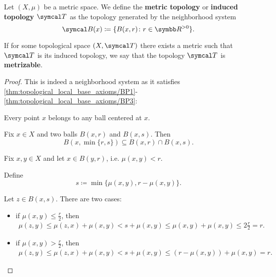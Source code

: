 \begin{definition}\label{def:metric_topology}\cite[249]{Engelking1989}
  Let \( (X, \mu) \) be a metric space. We define the \textbf{metric topology} or \textbf{induced topology} \( \Cal{T} \) as the topology generated by the neighborhood system
  \begin{equation*}
    \Cal{B}(x) \coloneqq \{ B (x, r) \colon r \in \BB{R}^{>0} \}.
  \end{equation*}

  If for some topological space \( (X, \Cal{T}) \) there exists a metric such that \( \Cal{T} \) is its induced topology, we say that the topology \( \Cal{T} \) is \textbf{metrizable}.
\end{definition}
\begin{proof}
  This is indeed a neighborhood system as it satisfies \ref{thm:topological_local_base_axioms/BP1}-\ref{thm:topological_local_base_axioms/BP3}:

  \begin{description}
     Every point \( x \) belongs to any ball centered at \( x \).

     Fix \( x \in X \) and two balls \( B(x, r) \) and \( B(x, s) \). Then
    \begin{equation*}
      B(x, \min\{ r, s \}) \subseteq B(x, r) \cap B(x, s).
    \end{equation*}

     Fix \( x, y \in X \) and let \( x \in B(y, r) \), i.e. \( \mu(x, y) < r \).

    Define
    \begin{equation*}
      s \coloneqq \min\{ \mu(x, y), r - \mu(x, y) \}.
    \end{equation*}

    Let \( z \in B(x, s) \). There are two cases:
    \begin{itemize}
      \item if \( \mu(x, y) \leq \tfrac r 2 \), then
      \begin{align*}
        \mu(z, y)
        \leq
        \mu(z, x) + \mu(x, y)
        <
        s + \mu(x, y)
        \leq
        \mu(x, y) + \mu(x, y)
        \leq
        2 \tfrac r 2
        =
        r.
      \end{align*}

      \item if \( \mu(x, y) > \tfrac r 2 \), then
      \begin{align*}
        \mu(z, y)
        \leq
        \mu(z, x) + \mu(x, y)
        <
        s + \mu(x, y)
        \leq
        (r - \mu(x, y)) + \mu(x, y)
        =
        r.
      \end{align*}
    \end{itemize}


\end{description}
\end{proof}
